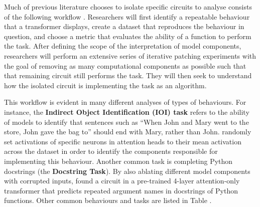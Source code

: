 \documentclass[11pt]{scrartcl}
\begin{document}
Much of previous literature chooses to isolate specific circuits to analyse consists of the following workflow \cite{conmy2024towards}. Researchers will first identify a repeatable behaviour that a transformer displays, create a dataset that reproduces the behaviour in question, and choose a metric that evaluates the ability of a function to perform the task. After defining the scope of the interpretation of model components, researchers will perform an extensive series of iterative patching experiments with the goal of removing as many computational components as possible such that that remaining circuit still performs the task. They will then seek to understand how the isolated circuit is implementing the task as an algorithm. 

This workflow is evident in many different analyses of types of behaviours. For instance, the \textbf{Indirect Object Identification (IOI) task} refers to the ability of models to identify that sentences such as ``When John and Mary went to the store, John gave the bag to'' should end with Mary, rather than John. \textcite{wang2022interpretability} randomly set activations of specific neurons in attention heads to their mean activation across the dataset in order to identify the components responsible for implementing this behaviour. Another common task is completing Python docstrings (the \textbf{Docstring Task}). By also ablating different model components with corrupted inputs, \textcite{heimersheim2023circuit} found a circuit in a pre-trained 4-layer attention-only transformer that predicts repeated argument names in docstrings of Python functions. Other common behaviours and tasks are listed in Table . 
\end{document}
